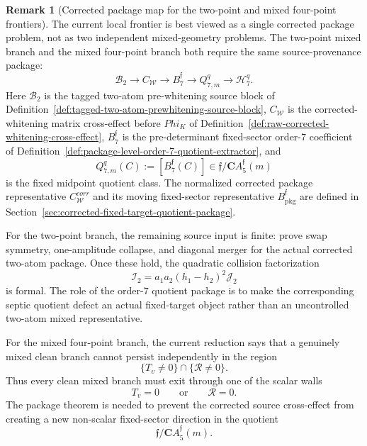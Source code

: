 \documentclass[11pt,a4paper]{amsart}
\def\Phi{Phi}%
\def\corr{corr}%
\theoremstyle{plain}
\theoremstyle{definition}
\newtheorem{remark}[theorem]{Remark}
\newcommand{\corr}{\mathrm{corr}}
\begin{document}
\begin{remark}[Corrected package map for the two-point and mixed four-point frontiers]
\label{rem:corrected-package-map-two-point-four-point}
The current local frontier is best viewed as a single corrected package
problem, not as two independent mixed-geometry problems.  The two-point mixed
branch and the mixed four-point branch both require the same source-provenance
package:
\[
\mathcal B_2
\longrightarrow
C_{\mathcal W}
\longrightarrow
B_7^{\mathfrak f}
\longrightarrow
Q_{7,m}^q
\longrightarrow
\mathcal H_7^q .
\]
Here \(\mathcal B_2\) is the tagged two-atom pre-whitening source block of
Definition~\ref{def:tagged-two-atom-prewhitening-source-block},
\(C_{\mathcal W}\) is the corrected-whitening matrix cross-effect before
\(\Phi_K\) of
Definition~\ref{def:raw-corrected-whitening-cross-effect},
\(B_7^{\mathfrak f}\) is the pre-determinant fixed-sector order-\(7\)
coefficient of
Definition~\ref{def:package-level-order-7-quotient-extractor}, and
\[
Q_{7,m}^q(C):=[B_7^{\mathfrak f}(C)]
\in
\mathfrak f/\mathbf C A_5^{\mathfrak f}(m)
\]
is the fixed midpoint quotient class.  The normalized corrected package
representative \(C_{\mathcal W}^{\corr}\) and its moving fixed-sector
representative \(B_{\mathrm{pkg}}^{\mathfrak f}\) are defined in
Section~\ref{sec:corrected-fixed-target-quotient-package}.

For the two-point branch, the remaining source input is finite: prove swap
symmetry, one-amplitude collapse, and diagonal merger for the actual corrected
two-atom package.  Once these hold, the quadratic collision factorization
\[
\mathcal I_2=a_1a_2(h_1-h_2)^2\mathcal J_2
\]
is formal.  The role of the order-\(7\) quotient package is to make the
corresponding septic quotient defect an actual fixed-target object rather than
an uncontrolled two-atom mixed representative.

For the mixed four-point branch, the current reduction says that a genuinely
mixed clean branch cannot persist independently in the region
\[
\{T_v\ne0\}\cap\{\mathcal R\ne0\}.
\]
Thus every clean mixed branch must exit through one of the scalar walls
\[
T_v=0
\qquad\text{or}\qquad
\mathcal R=0.
\]
The package theorem is needed to prevent the corrected source cross-effect
from creating a new non-scalar fixed-sector direction in the quotient
\[
\mathfrak f/\mathbf C A_5^{\mathfrak f}(m).
\]


\end{remark}
\end{document}
